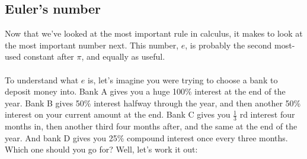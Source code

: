 \documentclass[11pt, leqno]{article}
\numberwithin{equation}{section}
\begin{document}
\subsection{Euler's number}
Now that we've looked at the most important rule in calculus, it makes to look at the most important number next. This number, $e$, is probably the second most-used constant after $\pi$, and equally as useful. 
\\ \\ To understand what $e$ is, let's imagine you were trying to choose a bank to deposit money into. Bank A gives you a huge 100\% interest at the end of the year. Bank B gives 50\% interest halfway through the year, and then another 50\% interest on your current amount at the end. Bank C gives you $\frac{1}{3}$ rd interest four months in, then another third four months after, and the same at the end of the year. And bank D gives you 25\% compound interest once every three months. Which one should you go for? Well, let's work it out:
\end{document}
